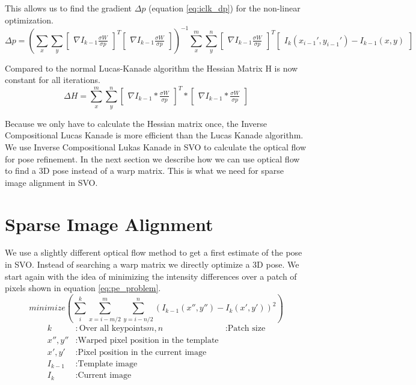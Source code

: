 \documentclass[11pt,a4paper,titlepage,oneside]{report}
\begin{document}
This allows us to find the gradient $\Delta p$ (equation \ref{eq:iclk_dp}) for the non-linear optimization.
\tiny
\begin{equation}\label{eq:iclk_dp}
  \Delta p=(\sum_x\sum_y\begin{bmatrix}\nabla I_{k-1}\frac{\sigma W}{\sigma p}\end{bmatrix}^T\begin{bmatrix}\nabla I_{k-1}\frac{\sigma W}{\sigma p}\end{bmatrix})^{-1}
  \sum_x^m\sum_y^n\begin{bmatrix}\nabla I_{k-1}\frac{\sigma W}{\sigma p}\end{bmatrix}^T\begin{bmatrix}I_{k}(x_{i-1}',y_{i-1}') - I_{k-1}(x,y)\end{bmatrix}
\end{equation}
\normalsize

Compared to the normal Lucas-Kanade algorithm the Hessian Matrix H is now constant for all iterations.
\begin{equation}
  \Delta H=\sum_x^m\sum_y^n\begin{bmatrix}\nabla I_{k-1}*\frac{\sigma W}{\sigma p}\end{bmatrix}^T*\begin{bmatrix}\nabla I_{k-1}*\frac{\sigma W}{\sigma p}\end{bmatrix}
\end{equation}

Because we only have to calculate the Hessian matrix once, the Inverse Compositional Lucas Kanade is more efficient than the Lucas Kanade algorithm.\\
We use Inverse Compositional Lukas Kanade in SVO to calculate the optical flow for pose refinement. In the next section we describe how we can use optical flow to find a 3D pose instead of a warp matrix. This is what we need for sparse image alignment in SVO.

\section{Sparse Image Alignment}\label{sec:pose_estimation}
We use a slightly different optical flow method to get a first estimate of the pose in SVO. Instead of searching a warp matrix we directly optimize a 3D pose. We start again with the idea of minimizing the intensity differences over a patch of pixels shown in equation \ref{eq:pe_problem}.
\begin{equation}\label{eq:pe_problem}
	minimize(\sum_i^k\sum_{x=i-m/2}^m\sum_{y=i-n/2}^n(I_{k-1}(x'',y'')-I_{k}(x',y'))^2)
\end{equation}
\begin{align*}
	k          &: \text{Over all keypoints}
	m,n				 &: \text{Patch size}\\
  x'',y''    &: \text{Warped pixel position in the template}\\
  x',y'      &: \text{Pixel position in the current image}\\
  I_{k-1}    &: \text{Template image}\\
  I_{k}      &: \text{Current image}
\end{align*}
\end{document}
